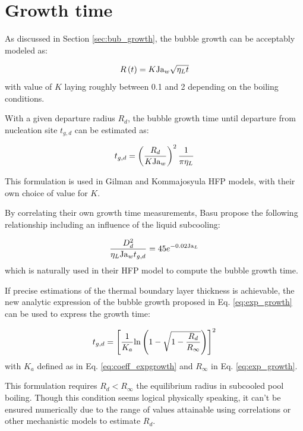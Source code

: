 \section{Growth time}
\label{sec:growth_time}


As discussed in Section \ref{sec:bub_growth}, the bubble growth can be acceptably modeled as:

\begin{equation}
R\left( t \right) = K\mathrm{Ja}_{w} \sqrt{\eta_{L}t}
\end{equation}
with value of $K$ laying roughly between 0.1 and 2 depending on the boiling conditions.

\npar

With a given departure radius $R_{d}$, the bubble growth time until departure from nucleation site $t_{g,d}$ can be estimated as:

\begin{equation}
t_{g,d} = \left( \frac{R_{d}}{K \mathrm{Ja}_{w}} \right)^{2} \frac{1}{\pi \eta_{L}}
\label{eq:tg_dep}
\end{equation}

\begin{note*}{}
This formulation is used in Gilman \cite{gilman_development_2014} and Kommajosyula \cite{kommajosyula_development_2020} HFP models, with their own choice of value for $K$.
\end{note*}

By correlating their own growth time measurements, Basu \etal \cite{basu_wall_2005} propose the following relationship including an influence of the liquid subcooling:

\begin{equation}
\frac{D_{d}^{2}}{\eta_{L}\mathrm{Ja}_{w}t_{g,d}} = 45  e^{-0.02\mathrm{Ja}_{L}}
\end{equation}
which is naturally used in their HFP model to compute the bubble growth time.

\npar


\begin{remark*}{}
If precise estimations of the thermal boundary layer thickness is achievable, the new analytic expression of the bubble growth proposed in Eq. \ref{eq:exp_growth} can be used to express the growth time:

\begin{equation}
t_{g,d} = \left[ \frac{1}{K_{a}} \mathrm{ln}\left( 1-\sqrt{1-\dfrac{R_{d}}{R_{\infty}}}  \right)  \right]^{2}
\end{equation}
with $K_{a}$ defined as in Eq. \ref{eq:coeff_expgrowth} and $R_{\infty}$ in Eq. \ref{eq:exp_growth}.

\npar
This formulation requires $R_{d} < R_{\infty}$ the equilibrium radius in subcooled pool boiling. Though this condition seems logical physically speaking, it can't be ensured numerically due to the range of values attainable using correlations or other mechanistic models to estimate $R_{d}$.
\end{remark*}






